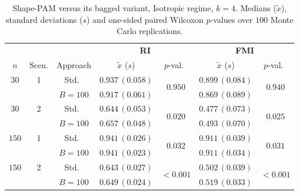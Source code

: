 \documentclass[11pt,a4paper]{article}
\begin{document}
\begin{table}[h]
\centering
\caption{Shape-PAM versus its bagged variant, Isotropic regime, $k=4$. Medians ($\tilde x$), standard deviations ($s$) and one-sided paired Wilcoxon $p$-values over $100$ Monte Carlo replications.}
\label{tab:pam-iso-k4}
\footnotesize
\begin{tabular}{cc c cc cc}
\toprule
& & & \multicolumn{2}{c}{\textbf{RI}} & \multicolumn{2}{c}{\textbf{FMI}} \\
\cmidrule(lr){4-5}\cmidrule(lr){6-7}
$n$ & Scen. & Approach & $\tilde x$ ($s$) & $p$-val.\ & $\tilde x$ ($s$) & $p$-val.\ \\
\midrule
$30$ & 1 & Std.\ & $0.937\,(0.058)$ & \multirow{2}{*}{$0.950$} & $0.899\,(0.084)$ & \multirow{2}{*}{$0.940$} \\
     &   & $B{=}100$ & $0.917\,(0.061)$ & & $0.869\,(0.089)$ & \\
$30$ & 2 & Std.\ & $0.644\,(0.053)$ & \multirow{2}{*}{$\mathbf{0.020}$} & $0.477\,(0.073)$ & \multirow{2}{*}{$\mathbf{0.025}$} \\
     &   & $B{=}100$ & $0.657\,(0.048)$ & & $0.493\,(0.070)$ & \\
$150$ & 1 & Std.\ & $0.941\,(0.026)$ & \multirow{2}{*}{$\mathbf{0.032}$} & $0.911\,(0.039)$ & \multirow{2}{*}{$\mathbf{0.031}$} \\
     &   & $B{=}100$ & $0.941\,(0.023)$ & & $0.911\,(0.034)$ & \\
$150$ & 2 & Std.\ & $0.643\,(0.027)$ & \multirow{2}{*}{$\mathbf{<\!0.001}$} & $0.502\,(0.039)$ & \multirow{2}{*}{$\mathbf{<\!0.001}$} \\
     &   & $B{=}100$ & $0.649\,(0.024)$ & & $0.519\,(0.033)$ & \\
\bottomrule
\end{tabular}
\end{table}
\end{document}
